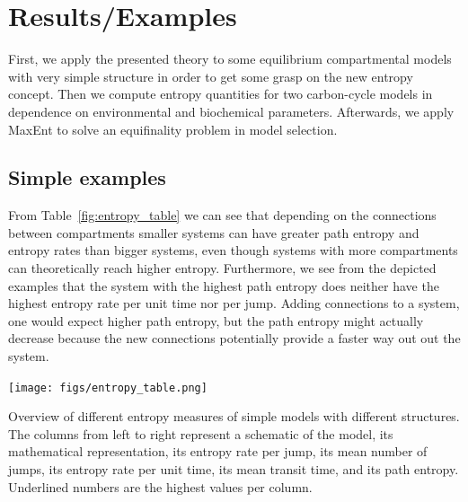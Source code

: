 \documentclass[smallextended]{svjour3}
\begin{document}
 
\section{Results/Examples}
First, we apply the presented theory to some equilibrium compartmental models with very simple structure in order to get some grasp on the new entropy concept.
Then we compute entropy quantities for two carbon-cycle models in dependence on environmental and biochemical parameters.
Afterwards, we apply MaxEnt to solve an equifinality problem in model selection.

\subsection{Simple examples}
\label{sec:simple_examples}
From Table~\ref{fig:entropy_table} we can see that depending on the connections between compartments smaller systems can have greater path entropy and entropy rates than bigger systems, even though systems with more compartments can theoretically reach higher entropy.
Furthermore, we see from the depicted examples that the system with the highest path entropy does neither have the highest entropy rate per unit time nor per jump.
Adding connections to a system, one would expect higher path entropy, but the path entropy might actually decrease because the new connections potentially provide a faster way out out the system.

\begin{table}[htbp]
  \centering
  \texttt{[image: figs/entropy\_table.png]}
  \caption{Overview of different entropy measures of simple models with different structures.
  The columns from left to right represent a schematic of the model, its mathematical representation, its entropy rate per jump, its mean number of jumps, its entropy rate per unit time, its mean transit time, and its path entropy.
  Underlined numbers are the highest values per column.}
  \label{fig:entropy_table}
\end{table}
\end{document}
